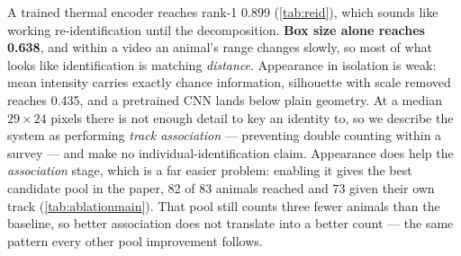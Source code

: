 A trained thermal encoder reaches rank-1 0.899 (\cref{tab:reid}), which sounds like working
re-identification until the decomposition. \textbf{Box size alone reaches 0.638}, and within
a video an animal's range changes slowly, so most of what looks like identification is
matching \emph{distance}. Appearance in isolation is weak: mean intensity carries exactly
chance information, silhouette with scale removed reaches 0.435, and a pretrained CNN lands
below plain geometry. At a median $29\times24$ pixels there is not enough detail to key an
identity to, so we describe the system as performing \emph{track association} --- preventing
double counting within a survey --- and make no individual-identification claim. Appearance does help the
\emph{association} stage, which is a far easier problem: enabling it gives the best candidate
pool in the paper, 82 of 83 animals reached and 73 given their own track
(\cref{tab:ablationmain}). That pool still counts three fewer animals than the baseline,
so better association does not translate into a better count --- the same pattern every other
pool improvement follows.
